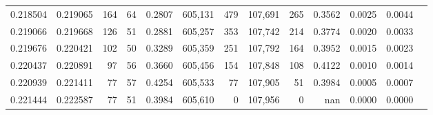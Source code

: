 \begin{tabular}{rrrrrrrrrrrrr}
0.218504 & 0.219065 &   164 &  64 &                                     0.2807 & 605,131 &     479 & 107,691 &     265 & 0.3562 & 0.0025 & 0.0044 \\
0.219066 & 0.219668 &   126 &  51 &                                     0.2881 & 605,257 &     353 & 107,742 &     214 & 0.3774 & 0.0020 & 0.0033 \\
0.219676 & 0.220421 &   102 &  50 &                                     0.3289 & 605,359 &     251 & 107,792 &     164 & 0.3952 & 0.0015 & 0.0023 \\
0.220437 & 0.220891 &    97 &  56 &                                     0.3660 & 605,456 &     154 & 107,848 &     108 & 0.4122 & 0.0010 & 0.0014 \\
0.220939 & 0.221411 &    77 &  57 &                                     0.4254 & 605,533 &      77 & 107,905 &      51 & 0.3984 & 0.0005 & 0.0007 \\
0.221444 & 0.222587 &    77 &  51 &                                     0.3984 & 605,610 &       0 & 107,956 &       0 &    nan & 0.0000 & 0.0000 \\
\bottomrule
\end{tabular}

